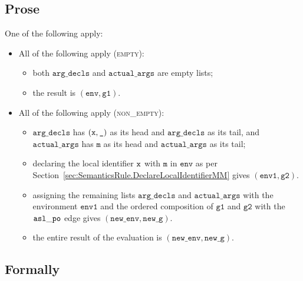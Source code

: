 \documentclass{book}
\newcommand\secref[1]{Section~\ref{sec:#1}}
\newcommand\ordered[3]{{#1}\xrightarrow{#2}{#3}}
\newcommand\evalarrow[0]{\stackrel{\mathsf{asl}}{\rightsquigarrow}}
\newcommand\assignargs[0]{\texttt{assign\_args}}
\newcommand\newenv[0]{\texttt{new\_env}}
\newcommand\env[0]{\texttt{env}}
\newcommand\envone[0]{\texttt{env1}}
\newcommand\vg[0]{\texttt{g}}
\newcommand\newg[0]{\texttt{new\_g}}
\newcommand\vm[0]{\texttt{m}}
\newcommand\vgone[0]{\texttt{g1}}
\newcommand\vgtwo[0]{\texttt{g2}}
\newcommand\actualargs[0]{\texttt{actual\_args}}
\newcommand\argdecls[0]{\texttt{arg\_decls}}
\begin{document}
\subsection{Prose}
One of the following apply:
\begin{itemize}
  \item All of the following apply (\textsc{empty}):
  \begin{itemize}
    \item both $\argdecls$ and $\actualargs$ are empty lists;
    \item the result is $(\env, \vgone)$.
  \end{itemize}

  \item All of the following apply (\textsc{non\_empty}):
  \begin{itemize}
    \item $\argdecls$ has $(\texttt{x}, \texttt{\_})$ as its head and $\argdecls$ as its tail,
    and $\actualargs$ has $\vm$ as its head and $\actualargs$ as its tail;
    \item declaring the local identifier $\texttt{x}$ with $\vm$ in $\env$ as per \secref{SemanticsRule.DeclareLocalIdentifierMM}
    gives $(\envone, \vgtwo)$.
    \item assigning the remaining lists $\argdecls$ and $\actualargs$ with the environment $\envone$ and the ordered
    composition of $\vgone$ and $\vgtwo$ with the $\mathtt{asl\_po}$ edge gives $(\newenv, \newg)$.
    \item the entire result of the evaluation is $(\newenv, \newg)$.
  \end{itemize}
\end{itemize}

\begin{emptyformal}
\subsection{Formally}
\end{emptyformal}
\end{document}
